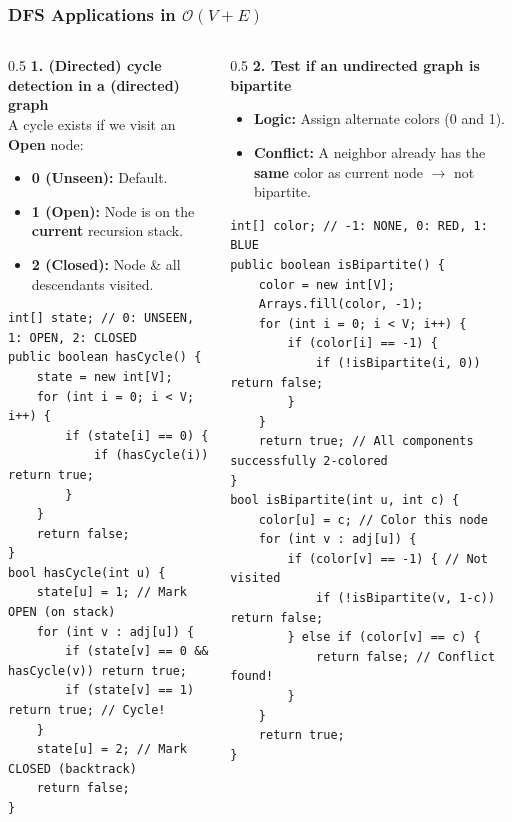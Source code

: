 \documentclass[8pt,aspectratio=169]{beamer}
\begin{document}
\begin{frame}[t, fragile]
\frametitle{DFS Applications in $\mathcal{O}(V+E)$}
\begin{columns}[T]
    \begin{column}{0.5\textwidth}
        \textbf{1. (Directed) cycle detection in a (directed) graph}\\
        A cycle exists if we visit an \textbf{Open} node:
        \begin{itemize}
                    \item \textbf{0 (Unseen):} Default.
                    \item \textbf{1 (Open):} Node is on the \textbf{current} recursion stack.
                    \item \textbf{2 (Closed):} Node \& all descendants visited.
        \end{itemize}
        \begin{lstlisting}[basicstyle=\tiny\ttfamily, frame=single]
int[] state; // 0: UNSEEN, 1: OPEN, 2: CLOSED
public boolean hasCycle() {
    state = new int[V]; 
    for (int i = 0; i < V; i++) {
        if (state[i] == 0) {
            if (hasCycle(i)) return true;
        }
    }
    return false;
}
bool hasCycle(int u) {
    state[u] = 1; // Mark OPEN (on stack)
    for (int v : adj[u]) {
        if (state[v] == 0 && hasCycle(v)) return true;
        if (state[v] == 1) return true; // Cycle!
    }
    state[u] = 2; // Mark CLOSED (backtrack)
    return false;
}
        \end{lstlisting}
    \end{column}

    \begin{column}{0.5\textwidth}
        \textbf{2. Test if an undirected graph is bipartite}
        \begin{itemize}
            \item \textbf{Logic:} Assign alternate colors (0 and 1).
            \item \textbf{Conflict:} A neighbor already has the \textbf{same} color as current node $\rightarrow$ not bipartite.
        \end{itemize}
        \begin{lstlisting}[basicstyle=\tiny\ttfamily, frame=single]
int[] color; // -1: NONE, 0: RED, 1: BLUE
public boolean isBipartite() {
    color = new int[V];
    Arrays.fill(color, -1);
    for (int i = 0; i < V; i++) {
        if (color[i] == -1) { 
            if (!isBipartite(i, 0)) return false;
        }
    }
    return true; // All components successfully 2-colored
}
bool isBipartite(int u, int c) {
    color[u] = c; // Color this node
    for (int v : adj[u]) {
        if (color[v] == -1) { // Not visited
            if (!isBipartite(v, 1-c)) return false;
        } else if (color[v] == c) {
            return false; // Conflict found!
        }
    }
    return true;
}
        \end{lstlisting}
    \end{column}
\end{columns}
\end{frame}
\end{document}
